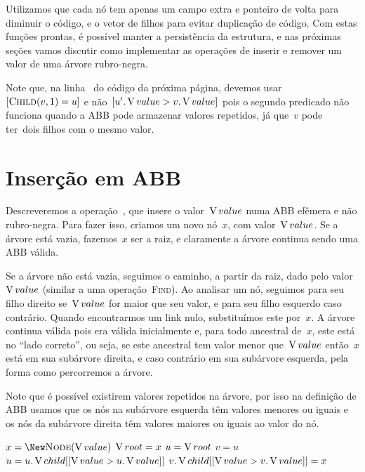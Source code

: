 \documentclass[main.tex]{subfiles}
\begin{document}
Utilizamos que cada nó tem apenas um campo extra e ponteiro de volta para diminuir o código, e o vetor de filhos para evitar duplicação de código. Com estas funções prontas, é possível manter a persistência da estrutura, e nas próximas seções vamos discutir como implementar as operações de inserir e remover um valor de uma árvore rubro-negra.

Note que, na linha~ do código da próxima página, devemos usar~$[\Call{Child}{v, 1} = u]$ e não~$[u'.\operatorname{V}{value} > v.\operatorname{V}{value}]$ pois o segundo predicado não funciona quando a ABB pode armazenar valores repetidos, já que~$v$ pode ter~dois filhos com o mesmo valor.

\section{Inserção em ABB}

Descreveremos a operação~, que insere o valor~$\operatorname{V}{value}$ numa ABB efêmera e não rubro-negra. Para fazer isso, criamos um novo nó~$x$, com valor~$\operatorname{V}{value}$. Se a árvore está vazia, fazemos~$x$ ser a raiz, e claramente a árvore continua sendo uma ABB válida.

Se a árvore não está vazia, seguimos o caminho, a partir da raiz, dado pelo valor~$\operatorname{V}{value}$ (similar a uma operação~\textsc{Find}). Ao analisar um nó, seguimos para seu filho direito se~$\operatorname{V}{value}$ for maior que seu valor, e para seu filho esquerdo caso contrário. Quando encontrarmos um link nulo, substituímos este por~$x$. A árvore continua válida pois era válida inicialmente e, para todo ancestral de~$x$, este está no ``lado correto'', ou seja, se este ancestral tem valor menor que~$\operatorname{V}{value}$ então~$x$ está em sua subárvore direita, e caso contrário em sua subárvore esquerda, pela forma como percorremos a árvore.

Note que é possível existirem valores repetidos na árvore, por isso na definição de ABB usamos que os nós na subárvore esquerda têm valores menores ou iguais e os nós da subárvore direita têm valores maiores ou iguais ao valor do nó.

\begin{algorithm}
\begin{algorithmic}[1]

	\State $x = \New \Call{Node}{\val}$ 
		\State $\operatorname{V}{root} = x$
	\Else
		\State $u = \operatorname{V}{root}$
		 
			\State $v = u$
			\State $u = u.\operatorname{V}{child}[[\operatorname{V}{value} > u.\operatorname{V}{value}]]$
		\EndWhile
		\State $v.\operatorname{V}{child}[[\operatorname{V}{value} > v.\operatorname{V}{value}]] = x$
	\EndIf
\EndFunction

\end{algorithmic}
\end{algorithm}
\end{document}
